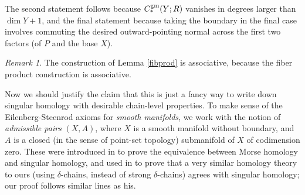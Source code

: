 \documentclass{memo-l}
\theoremstyle{definition}
\theoremstyle{remark}
\newtheorem{remark}[theorem]{Remark}
\numberwithin{section}{chapter}
\numberwithin{equation}{chapter}
\begin{document}
The second statement follows because $C^{\textup{gm}}_*(Y;R)$ vanishes in degrees larger than $\dim Y + 1$, and the final statement because taking the boundary in the final case involves commuting the desired outward-pointing normal across the first two factors (of $P$ and the base $X$). 

\begin{remark}\label{rmk:assoc2}
The construction of Lemma \ref{fibprod} is associative, because the fiber product construction is associative. 
\end{remark}

Now we should justify the claim that this is just a fancy way to write down singular homology with desirable chain-level properties. To make sense of the Eilenberg-Steenrod axioms for \emph{smooth manifolds}, we work with the notion of \emph{admissible pairs} $(X,A)$, where $X$ is a smooth manifold without boundary, and $A$ is a closed (in the sense of point-set topology) submanifold of $X$ of codimension zero. These were introduced in \cite{Schwarz} to prove the equivalence between Morse homology and singular homology, and used in \cite[Theorem~4.1.13]{Lin} to prove that a very similar homology theory to ours (using $\delta$-chains, instead of strong $\delta$-chains) agrees with singular homology; our proof follows similar lines as his.
\end{document}
